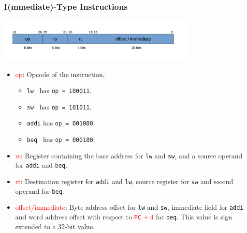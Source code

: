 \documentclass{beamer}
\begin{document}
\begin{frame}%
\frametitle{I(mmediate)-Type Instructions}

\begin{center}
  \includegraphics[width=10cm]{itype.pdf}
\end{center}

\vspace{-0.3cm}

\scriptsize

\begin{itemize}
\item \textcolor{red}{op}: Opcode of the instruction,
  \begin{itemize}
    \scriptsize
  \item \lstinline{lw}\texttt{  } has \texttt{op = 100011}.
  \item \lstinline{sw}\texttt{  } has \texttt{op = 101011}.
  \item \lstinline{addi} has \texttt{op = 001000}.
  \item \lstinline{beq}\texttt{ }  has \texttt{op = 000100}.
  \end{itemize}
\vspace{0.1cm}
\item \textcolor{red}{rs}: Register containing the base address for \lstinline{lw} and \lstinline{sw}, and a source operand for
  \lstinline{addi} and \lstinline{beq}.
\vspace{0.1cm}
\item \textcolor{red}{rt}: Destination register for \lstinline{addi} and \lstinline{lw}, source register for \lstinline{sw} and second
  operand for \lstinline{beq}.
\vspace{0.1cm}
\item \textcolor{red}{offset/immediate}: Byte address offset for \lstinline{lw} and \lstinline{sw}, immediate field for \lstinline{addi} and
  word address offset with respect to \textcolor{red}{\texttt{PC} $+\ 4$} for \lstinline{beq}. This value is sign extended to a $32$-bit value.

\end{itemize}

\end{frame}
\end{document}
